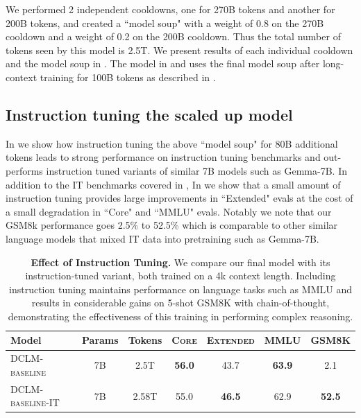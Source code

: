\documentclass{article}
\newcommand{\hqpool}{\textsc{DCLM-baseline}\xspace}
\newcommand{\lowvar}{\textsc{Core}\xspace}
\newcommand{\aggscore}{\textsc{Extended}\xspace}
\begin{document}
We performed 2 independent cooldowns, one for 270B tokens and another for 200B tokens, and created a ``model soup" \citep{wortsman2022model} with a weight of 0.8 on the 270B cooldown and a weight of 0.2 on the 200B cooldown. Thus the total number of tokens seen by this model is 2.5T. We present results of each individual cooldown and the model soup in . The model in  and  uses the final model soup after long-context training for 100B tokens as described in .

\subsection{Instruction tuning the scaled up model}
In  we show how instruction tuning the above ``model soup" for 80B additional tokens leads to strong performance on instruction tuning benchmarks and out-performs instruction tuned variants of similar 7B models such as Gemma-7B. In addition to the IT benchmarks covered in , In  we show that a small amount of instruction tuning provides large improvements in ``Extended" evals at the cost of a small degradation in ``Core" and ``MMLU" evals. Notably we note that our GSM8k performance goes 2.5\% to 52.5\% which is comparable to other similar language models that mixed IT data into pretraining such as Gemma-7B.

\begin{table}[ht]
\centering
\caption{\textbf{Effect of Instruction Tuning.} We compare our final model with its instruction-tuned variant, both trained on a 4k context length. Including instruction tuning maintains performance on language tasks such as MMLU and results in considerable gains on 5-shot GSM8K with chain-of-thought, demonstrating the effectiveness of this training in performing complex reasoning.}
\label{table:it-comp}

\begin{tabular}{lcccccc}
\toprule
      Model & Params & Tokens &       \lowvar            &     \aggscore & MMLU & GSM8K\\

\midrule

    \hqpool &     7B &   2.5T &                  \textbf{56.0}  &          43.7 &          \textbf{63.9} & 2.1\\
    
        \hqpool-IT &     7B &   2.58T &          55.0  &       \textbf{46.5} &          62.9 & \textbf{52.5}  \\\bottomrule

\end{tabular}

\end{table}
\end{document}
